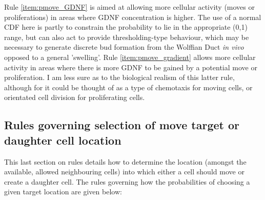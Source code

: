 \documentclass[pdftex,10pt,a4paper]{article}
\begin{document}
Rule \ref{item:pmove_GDNF} is aimed at allowing more cellular activity (moves or proliferations) in areas where GDNF concentration is higher. The use of a normal CDF here is partly to constrain the probability to lie in the appropriate (0,1) range, but can also act to provide thresholding-type behaviour, which may be necessary to generate discrete bud formation from the Wolffian Duct \textit{in vivo} opposed to a general 'swelling'. Rule \ref{item:pmove_gradient} allows more cellular activity in areas where there is more GDNF to be gained by a potential move or proliferation. I am less sure as to the biological realism of this latter rule, although for it could be thought of as a type of chemotaxis for moving cells, or orientated cell division for proliferating cells.

\subsection{Rules governing selection of move target or daughter cell location}\label{sec:rule_selection}
This last section on rules details how to determine the location (amongst the available, allowed neighbouring cells) into which either a cell should move or create a daughter cell. The rules governing how the probabilities of choosing a given target location are given below:
\end{document}
